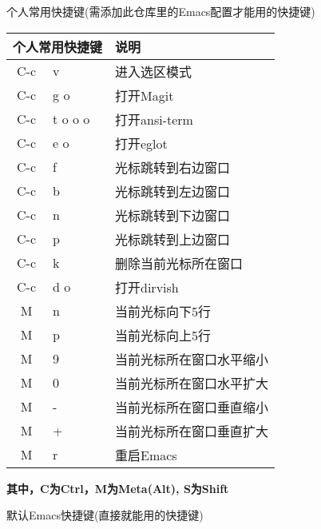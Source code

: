 \documentclass[11pt]{article}
\begin{document}
\newpage{}
\begin{flushleft}
  个人常用快捷键(需添加此仓库里的Emacs配置才能用的快捷键)
\end{flushleft}
\begin{left}
  \begin{tabular}{|c|l|l|}
    \hline
    \multicolumn{2}{|c|}{个人常用快捷键} & 说明 \\ 
    \hline
    C-c & v & 进入选区模式 \\
    C-c & g o & 打开Magit \\
    C-c & t o o o & 打开ansi-term \\
    C-c & e o & 打开eglot \\
    C-c & f & 光标跳转到右边窗口 \\
    C-c & b & 光标跳转到左边窗口 \\
    C-c & n & 光标跳转到下边窗口 \\
    C-c & p & 光标跳转到上边窗口 \\
    C-c & k & 删除当前光标所在窗口 \\
    C-c & d o & 打开dirvish \\
    M & n & 当前光标向下5行 \\
    M & p & 当前光标向上5行 \\
    M & 9 & 当前光标所在窗口水平缩小 \\
    M & 0 & 当前光标所在窗口水平扩大 \\
    M & - & 当前光标所在窗口垂直缩小 \\
    M & + & 当前光标所在窗口垂直扩大 \\
    M & r & 重启Emacs \\                
    \hline
  \end{tabular}  
\end{left}
\begin{flushleft}
\textbf{其中，C为Ctrl，M为Meta(Alt), S为Shift}  
\end{flushleft}
\newpage{}
\begin{flushleft}
  默认Emacs快捷键(直接就能用的快捷键)
\end{flushleft}
\end{document}

